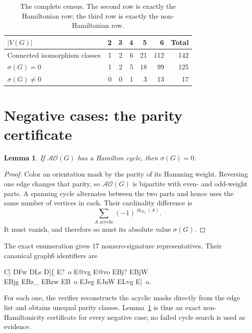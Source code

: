 \documentclass[11pt]{article}
\newtheorem{lemma}[theorem]{Lemma}
\newcommand{\AO}{\mathcal{AO}}
\begin{document}
\begin{table}[ht]
\centering
\caption{The complete census.  The second row is exactly the Hamiltonian row;
the third row is exactly the non-Hamiltonian row.}
\label{tab:census}
\begin{tabular}{lrrrrrr}
\toprule
$|V(G)|$ & 2 & 3 & 4 & 5 & 6 & Total\\
\midrule
Connected isomorphism classes & 1 & 2 & 6 & 21 & 112 & 142\\
$\sigma(G)=0$ & 1 & 2 & 5 & 18 & 99 & 125\\
$\sigma(G)\ne0$ & 0 & 0 & 1 & 3 & 13 & 17\\
\bottomrule
\end{tabular}
\end{table}

\section{Negative cases: the parity certificate}

\begin{lemma}\label{lem:parity}
If $\AO(G)$ has a Hamilton cycle, then $\sigma(G)=0$.
\end{lemma}

\begin{proof}
Color an orientation mask by the parity of its Hamming weight.  Reversing one
edge changes that parity, so $\AO(G)$ is bipartite with even- and odd-weight
parts.  A spanning cycle alternates between the two parts and hence uses the
same number of vertices in each.  Their cardinality difference is
\[
 \sum_{A\text{ acyclic}}(-1)^{\operatorname{rk}_{D_0}(A)}.
\]
It must vanish, and therefore so must its absolute value $\sigma(G)$.
\end{proof}

The exact enumeration gives 17 nonzero-signature representatives.  Their
canonical graph6 identifiers are
\begin{center}
\small\ttfamily
C] \quad DFw \quad DLs \quad D]\{ \quad E?\string~o \quad E@vg \quad E@vo
\quad EBj? \quad EBjW\\
EBjg \quad EBz\_ \quad EBzw \quad EB\string~o \quad EJeg \quad EJnW
\quad ELvg \quad E]\string~o.
\end{center}
For each one, the verifier reconstructs the acyclic masks directly from the
edge list and obtains unequal parity classes.  Lemma~\ref{lem:parity} is thus
an exact non-Hamiltonicity certificate for every negative case; no failed
cycle search is used as evidence.
\end{document}
